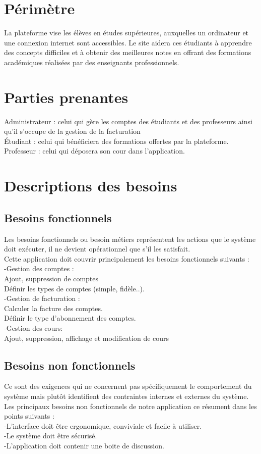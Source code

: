 \documentclass{report}
\begin{document}
\section{Périmètre}
La plateforme vise les élèves en études supérieures, auxquelles un ordinateur et une connexion internet sont accessibles. Le site aidera ces étudiants à apprendre des concepts difficiles et à obtenir des meilleures notes en offrant des formations académiques réalisées par des enseignants professionnels. 

\section{Parties prenantes }
Administrateur : celui qui gère les comptes des étudiants et des professeurs ainsi qu'il s'occupe de la gestion de la facturation
\\
Étudiant : celui qui bénéficiera des formations offertes par la plateforme. \\
Professeur : celui qui déposera son cour dans l'application. \\

\section{Descriptions des besoins }

\subsection{Besoins fonctionnels}

Les besoins fonctionnels ou besoin métiers représentent les actions que le système doit
exécuter, il ne devient opérationnel que s'il les satisfait.\\
Cette application doit couvrir principalement les besoins fonctionnels suivants : \\
-Gestion des comptes :\\
	Ajout, suppression de comptes\\
	Définir les types de comptes (simple, fidèle..).
\\
-Gestion de facturation :\\
	Calculer la facture des comptes. \\
	Définir le type d'abonnement des comptes.
\\	
-Gestion des cours:\\
	Ajout, suppression, affichage et modification de cours\\
	
\subsection{Besoins non fonctionnels}
Ce sont des exigences qui ne concernent pas spécifiquement le comportement du système
mais plutôt identifient des contraintes internes et externes du système.\\
 Les principaux besoins non fonctionnels de notre application ce résument dans les points
suivants :\\
-L'interface doit être ergonomique, conviviale et facile à utiliser.\\
-Le système doit être sécurisé.\\
-L'application doit contenir une boite de discussion.
\end{document}
